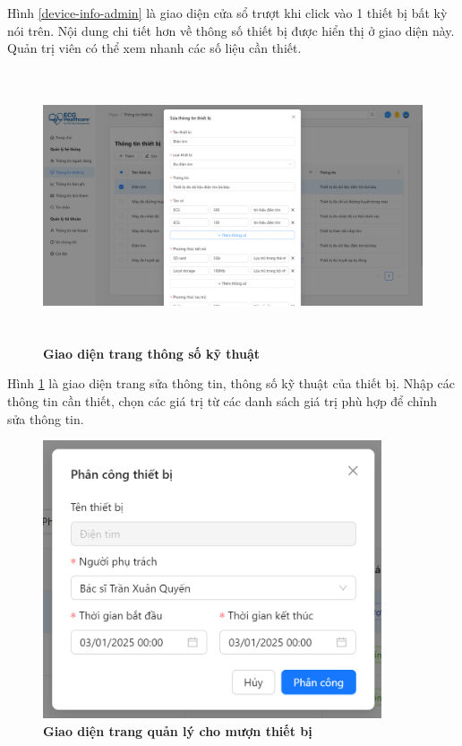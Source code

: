 Hình \ref{device-info-admin} là giao diện cửa sổ trượt khi click vào 1 thiết bị bất kỳ nói trên. Nội dung chi tiết hơn về thông số thiết bị được hiển thị ở giao diện này. Quản trị viên có thể xem nhanh các số liệu cần thiết.

\begin{figure}[H]
	\centering
	\includegraphics[width=15cm,height=8cm]{Images/admin_ui/device-detail.png}
	\caption[Giao diện trang thông số kỹ thuật]{\bfseries \fontsize{12pt}{0pt}\selectfont Giao diện trang thông số kỹ thuật}
	\label{device-detail-admin}
\end{figure}

Hình \ref{device-detail-admin} là giao diện trang sửa thông tin, thông số kỹ thuật của thiết bị. Nhập các thông tin cần thiết, chọn các giá trị từ các danh sách giá trị phù hợp để chỉnh sửa thông tin.

\begin{figure}[H]
	\centering
	\includegraphics[width=10cm]{Images/admin_ui/assign.png}
	\caption[Giao diện trang quản lý cho mượn thiết bị]{\bfseries \fontsize{12pt}{0pt}\selectfont Giao diện trang quản lý cho mượn thiết bị}
	\label{assign-admin}
\end{figure}

